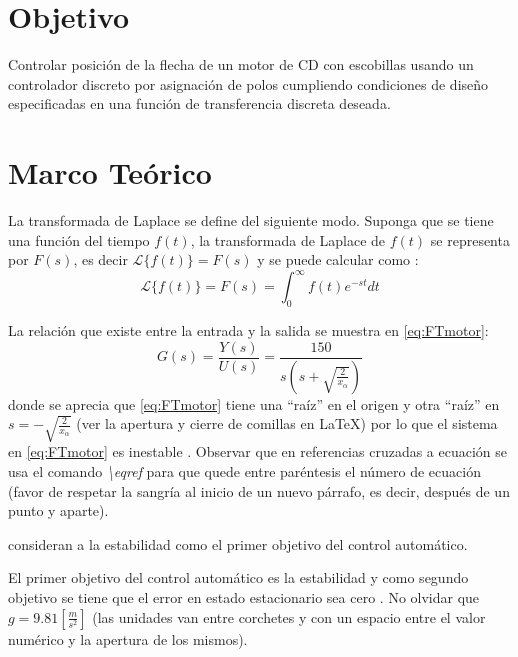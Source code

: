 \documentclass{article}
\begin{document}
\thispagestyle{empty}%
\tableofcontents
\listoffigures
\listoftables
\newpage



\section{Objetivo}
Controlar posición de la flecha de un motor de CD con escobillas usando un controlador discreto por asignación de polos cumpliendo condiciones de diseño especificadas en una función de transferencia discreta deseada.

\section{Marco Teórico}
La transformada de Laplace se define del siguiente modo. Suponga que se tiene una función del tiempo $f(t)$, la transformada de Laplace de $f(t)$ se representa por $F(s)$, es decir $\mathscr{L}\{f(t)\}=F(s)$ y se puede calcular como \citep{Ogata2010}:
\begin{equation}
\mathscr{L}\{f(t)\}=F(s)=\int_{0}^{\infty}f(t)e^{-st}dt
\label{eq:Def-Laplace}
\end{equation}

La relación que existe entre la entrada y la salida se muestra en \eqref{eq:FTmotor}:
\begin{equation}
G(s)=\frac{Y(s)}{U(s)}=\frac{150}{s\left( s+\sqrt{\frac{2}{x_\alpha}} \right) }
\label{eq:FTmotor}
\end{equation}
donde se aprecia que \eqref{eq:FTmotor} tiene una ``raíz'' en el origen y otra ``raíz'' en $s=-\sqrt{\frac{2}{x_\alpha}}$ (ver la apertura y cierre de comillas en LaTeX) por lo que el sistema en \eqref{eq:FTmotor} es inestable \citep{HernandezBook2013}. Observar que en referencias cruzadas a ecuación se usa el comando \emph{\textbackslash eqref} para que quede entre paréntesis el número de ecuación (favor de respetar la sangría al inicio de un nuevo párrafo, es decir, después de un punto y aparte).

\cite{Aguado2003} consideran a la estabilidad como el primer objetivo del control automático.

El primer objetivo del control automático es la estabilidad y como segundo objetivo se tiene que el error en estado estacionario sea cero \citep{Aguado2003}. No olvidar que $g=9.81\left[\frac{m}{s^2}\right]$ (las unidades van entre corchetes y con un espacio entre el valor numérico y la apertura de los mismos).
\end{document}
